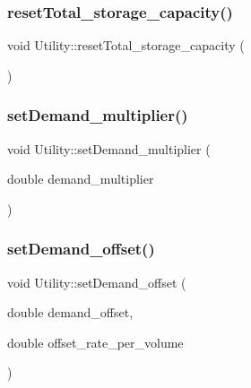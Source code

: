 \mbox{\label{classUtility_a0ac180e13fb963a29c2860664c3f352a_a0ac180e13fb963a29c2860664c3f352a}} 
\subsubsection{\texorpdfstring{reset\+Total\+\_\+storage\+\_\+capacity()}{resetTotal\_storage\_capacity()}}
{\footnotesize\ttfamily void Utility\+::reset\+Total\+\_\+storage\+\_\+capacity (\begin{DoxyParamCaption}{ }\end{DoxyParamCaption})}

\mbox{\label{classUtility_ad562626bc39694622495d2fb2b68ecd4_ad562626bc39694622495d2fb2b68ecd4}} 
\subsubsection{\texorpdfstring{set\+Demand\+\_\+multiplier()}{setDemand\_multiplier()}}
{\footnotesize\ttfamily void Utility\+::set\+Demand\+\_\+multiplier (\begin{DoxyParamCaption}\item[{double}]{demand\+\_\+multiplier }\end{DoxyParamCaption})}

\mbox{\label{classUtility_a6e7f1df1fcde0b14475c7045bdcaf218_a6e7f1df1fcde0b14475c7045bdcaf218}} 
\subsubsection{\texorpdfstring{set\+Demand\+\_\+offset()}{setDemand\_offset()}}
{\footnotesize\ttfamily void Utility\+::set\+Demand\+\_\+offset (\begin{DoxyParamCaption}\item[{double}]{demand\+\_\+offset,  }\item[{double}]{offset\+\_\+rate\+\_\+per\+\_\+volume }\end{DoxyParamCaption})}

